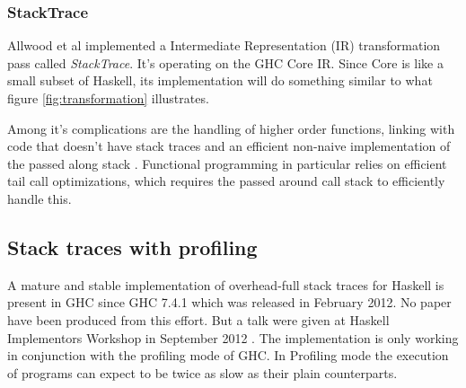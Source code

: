 \subsubsection{StackTrace}

Allwood et al implemented a Intermediate Representation (IR) transformation
pass called \emph{StackTrace}. It's operating on the GHC Core IR. Since
Core is like a small subset of Haskell, its implementation will do
something similar to what figure \ref{fig:transformation} illustrates.

Among it's complications are the
handling of higher order functions, linking with code that doesn't have stack
traces and an efficient non-naive implementation of the
passed along stack \cite{FindingTheNeedle2009}.
Functional programming in particular relies on efficient tail call
optimizations, which
requires the passed around call stack to efficiently handle this.



\subsection{Stack traces with profiling} \label{sec:stack_traces_with_profiling}

A mature and stable implementation of overhead-full stack traces for
Haskell is present in GHC since GHC 7.4.1 which was released in February
2012. No paper have been produced from this effort. But a talk were
given at Haskell Implementors Workshop in September 2012 \cite{HIW2012Programme}.
The implementation is only working in conjunction with the profiling
mode of GHC. In Profiling mode the execution of programs can expect to
be twice as slow as their plain counterparts.

